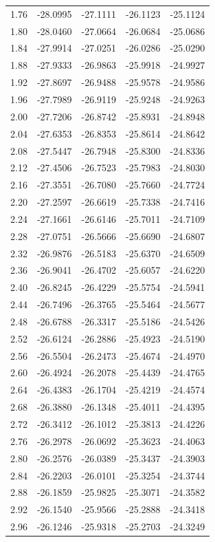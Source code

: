\documentclass[floatfix,traditabstract,preprint2]{aa}
\begin{document}
\begin{table}[!htbp]
\begin{tabular}{c  c c c c}
 1.76  & -28.0995  & -27.1111  & -26.1123  & -25.1124\\
 1.80  & -28.0460  & -27.0664  & -26.0684  & -25.0686\\
 1.84  & -27.9914  & -27.0251  & -26.0286  & -25.0290\\
 1.88  & -27.9333  & -26.9863  & -25.9918  & -24.9927\\
 1.92  & -27.8697  & -26.9488  & -25.9578  & -24.9586\\
 1.96  & -27.7989  & -26.9119  & -25.9248  & -24.9263\\
 2.00  & -27.7206  & -26.8742  & -25.8931  & -24.8948\\
 2.04  & -27.6353  & -26.8353  & -25.8614  & -24.8642\\
 2.08  & -27.5447  & -26.7948  & -25.8300  & -24.8336\\
 2.12  & -27.4506  & -26.7523  & -25.7983  & -24.8030\\
 2.16  & -27.3551  & -26.7080  & -25.7660  & -24.7724\\
 2.20  & -27.2597  & -26.6619  & -25.7338  & -24.7416\\
 2.24  & -27.1661  & -26.6146  & -25.7011  & -24.7109\\
 2.28  & -27.0751  & -26.5666  & -25.6690  & -24.6807\\
 2.32  & -26.9876  & -26.5183  & -25.6370  & -24.6509\\
 2.36  & -26.9041  & -26.4702  & -25.6057  & -24.6220\\
 2.40  & -26.8245  & -26.4229  & -25.5754  & -24.5941\\
 2.44  & -26.7496  & -26.3765  & -25.5464  & -24.5677\\
 2.48  & -26.6788  & -26.3317  & -25.5186  & -24.5426\\
 2.52  & -26.6124  & -26.2886  & -25.4923  & -24.5190\\
 2.56  & -26.5504  & -26.2473  & -25.4674  & -24.4970\\
 2.60  & -26.4924  & -26.2078  & -25.4439  & -24.4765\\
 2.64  & -26.4383  & -26.1704  & -25.4219  & -24.4574\\
 2.68  & -26.3880  & -26.1348  & -25.4011  & -24.4395\\
 2.72  & -26.3412  & -26.1012  & -25.3813  & -24.4226\\
 2.76  & -26.2978  & -26.0692  & -25.3623  & -24.4063\\
 2.80  & -26.2576  & -26.0389  & -25.3437  & -24.3903\\
 2.84  & -26.2203  & -26.0101  & -25.3254  & -24.3744\\
 2.88  & -26.1859  & -25.9825  & -25.3071  & -24.3582\\
 2.92  & -26.1540  & -25.9566  & -25.2888  & -24.3418\\
 2.96  & -26.1246  & -25.9318  & -25.2703  & -24.3249\\
\end{tabular}
\end{table}  
\end{document}
